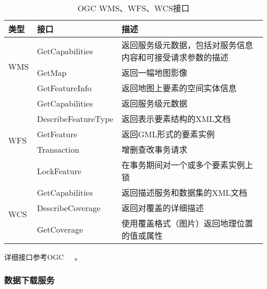 \begin{table}
    \centering
    \caption{OGC WMS、WFS、WCS接口}
    \label{tab:OGC-WMS-WFS-WCS}
    \begin{threeparttable}
        \begin{tabu} to .9
            \toprule[1.5pt]
            类型 & 接口 & 描述 \\
            \midrule[1.5pt]
             & GetCapabilities & 返回服务级元数据，包括对服务信息内容和可接受请求参数的描述 \\
            \cmidrule(lr){2-3}
            & GetMap & 返回一幅地图影像 \\
            \cmidrule(lr){2-3}
            & GetFeatureInfo & 返回地图上要素的空间实体信息 \\
            \hline
             & GetCapabilities & 返回服务级元数据 \\
            \cmidrule(lr){2-3}
            & DescribeFeatureType & 返回表示要素结构的XML文档 \\
            \cmidrule(lr){2-3}
            & GetFeature & 返回GML形式的要素实例 \\
            \cmidrule(lr){2-3}
            & Transaction & 增删查改事务请求 \\
            \cmidrule(lr){2-3}
            & LockFeature & 在事务期间对一个或多个要素实例上锁 \\
            \hline
             & GetCapabilities & 返回描述服务和数据集的XML文档 \\
            \cmidrule(lr){2-3}
            & DescribeCoverage & 返回对覆盖的详细描述 \\
            \cmidrule(lr){2-3}
            & GetCoverage & 使用覆盖格式（图片）返回地理位置的值或属性 \\
            \bottomrule[1.5pt]
        \end{tabu}
        \begin{tablenotes}
            \footnotesize
            \item 详细接口参考OGC~\cite{OGC-WMS}~\cite{OGC-WFS}~\cite{OGC-WCS}。
        \end{tablenotes}
    \end{threeparttable}
\end{table}



\subsubsection{数据下载服务}
